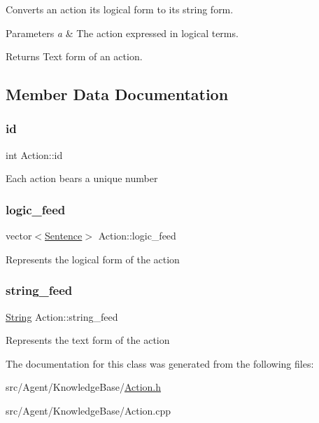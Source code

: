 Converts an action its logical form to its string form. 


\begin{DoxyParams}{Parameters}
{\em a} & The action expressed in logical terms. \\
\hline
\end{DoxyParams}
\begin{DoxyReturn}{Returns}
Text form of an action. 
\end{DoxyReturn}


\subsection{Member Data Documentation}
\mbox{\label{classAction_ae2c2239aee4b28f7c90f3dfa7abc060a}} 
\subsubsection{\texorpdfstring{id}{id}}
{\footnotesize\ttfamily int Action\+::id}

Each action bears a unique number \mbox{\label{classAction_ab3623cf8b6271dec461907a3e68687e4}} 
\subsubsection{\texorpdfstring{logic\+\_\+feed}{logic\_feed}}
{\footnotesize\ttfamily vector$<$\mbox{\hyperlink{classSentence}{Sentence}}$>$ Action\+::logic\+\_\+feed\hspace{0.3cm}{\ttfamily [private]}}

Represents the logical form of the action \mbox{\label{classAction_a22cc7c6c8cc34293f94713542eb7f353}} 
\subsubsection{\texorpdfstring{string\+\_\+feed}{string\_feed}}
{\footnotesize\ttfamily \mbox{\hyperlink{classString}{String}} Action\+::string\+\_\+feed\hspace{0.3cm}{\ttfamily [private]}}

Represents the text form of the action 

The documentation for this class was generated from the following files\+:\begin{DoxyCompactItemize}
\item 
src/\+Agent/\+Knowledge\+Base/\mbox{\hyperlink{Action_8h}{Action.\+h}}\item 
src/\+Agent/\+Knowledge\+Base/Action.\+cpp\end{DoxyCompactItemize}
